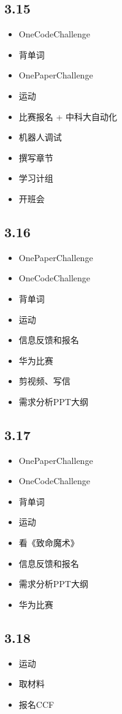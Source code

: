 \documentclass[UTF8]{ctexart}
\begin{document}
\subsection*{3.15}
\begin{itemize}
    \item OneCodeChallenge
    \item 背单词
    \item OnePaperChallenge
    \item 运动
    \item 比赛报名 + 中科大自动化
    \item 机器人调试
    \item 撰写章节
    \item 学习计组
    \item 开班会
\end{itemize}

\subsection*{3.16}
\begin{itemize}
    \item OnePaperChallenge
    \item OneCodeChallenge
    \item 背单词
    \item 运动
    \item 信息反馈和报名
    \item 华为比赛
    \item 剪视频、写信
    \item 需求分析PPT大纲
\end{itemize}

\subsection*{3.17}
\begin{itemize}
    \item OnePaperChallenge
    \item OneCodeChallenge
    \item 背单词
    \item 运动
    \item 看《致命魔术》
    \item 信息反馈和报名
    \item 需求分析PPT大纲
    \item 华为比赛
\end{itemize}

\subsection*{3.18}
\begin{itemize}
    \item 运动
    \item 取材料
    \item 报名CCF
\end{itemize}
\end{document}
